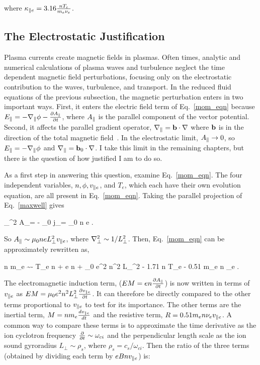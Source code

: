 where $\kappa_{\parallel e} = 3.16 \frac{n T_e}{m_e \nu_{e}}$.

\subsection{The Electrostatic Justification}
\label{ss_es_justification}

Plasma currents create magnetic fields in plasmas. Often times, analytic and numerical calculations
of plasma waves and turbulence neglect the time dependent magnetic field perturbations, focusing only on the electrostatic contribution to the waves, turbulence, and transport.
In the reduced fluid equations of the previous subsection, the magnetic perturbation enters in two important ways. First, it enters the electric field term of Eq.~\ref{mom_eqn}
because $E_\parallel = -\nabla_\parallel \phi - \frac{\partial A_\parallel}{\partial t}$, where $A_\parallel$ is the parallel component of the vector potential. Second, it affects the parallel gradient operator, 
$\nabla_\parallel = {\bf b} \cdot \nabla$ where ${\bf b}$ is in the direction of the total magnetic field~\cite{simakov2003}.
In the electrostatic limit, $A_\parallel \rightarrow 0$, so $E_\parallel = -\nabla_\parallel \phi$ and $\nabla_\parallel = {\bf b}_0 \cdot \nabla$. I take
this limit in the remaining chapters, but there is the question of how justified I am to do so. 

As a first step in answering this question, examine Eq.~\ref{mom_eqn}. The four independent variables, $n, \phi, v_{\parallel e}$, and $T_e$, which each have their own evolution equation, are all
present in Eq.~\ref{mom_eqn}. Taking the parallel projection of Eq.~\ref{maxwell} gives

\beq
\label{Apar_eqn}
\grad_\perp^2 A_\para = - \mu_0 j_\para = \mu_0 n e \vpe.
\eeq

So $A_\parallel \sim \mu_0 n e L_\perp^2 v_{\parallel e}$, where $\nabla_\perp^2 \sim 1/L_\perp^2$. Then, Eq.~\ref{mom_eqn} can be approximately rewritten as,

\beq
\label{mom_eqn_Apar}
n m_e  \sim - T_e \gradpar n + e n \gradpar \phi + \mu_0 e^2 n^2 L_\perp^2  - 1.71 n \gradpar T_e - 0.51 m_e n \nu_e \vpe.
\eeq

The electromagnetic induction term, ($EM = e n \frac{\partial A_\parallel}{\partial t}$) is now written in terms of $v_{\parallel e}$ as $EM = \mu_0 e^2 n^2 L_\perp^2 \frac{\partial v_{\parallel e}}{\partial t}$. 
It can therefore be directly compared to the other terms proportional to $v_{\parallel e}$ to test for its importance. 
The other terms are the inertial term, $M = n m_e \frac{dv_{\parallel e}}{dt}$ and the resistive term, $R = 0.51 m_e n \nu_e v_{\parallel e}$. A common way to compare these terms is to approximate the time
derivative as the ion cyclotron frequency $\frac{\partial}{\partial t} \sim \omega_{ci}$ and the perpendicular length scale as the ion sound gyroradius $L_\perp \sim \rho_s$, where $\rho_s = c_s/\omega_{ci}$.
Then the ratio of the three terms (obtained by dividing each term by $e B n v_{\parallel e}$) is: 

